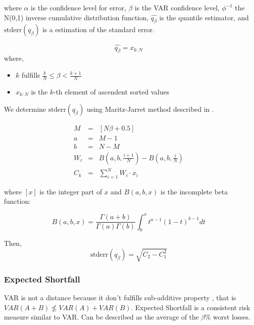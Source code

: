 \documentclass[a4paper,12pt,final]{article}
\begin{document}
where $\alpha$ is the confidence level for error, $\beta$ is the VAR confidence 
level, $\phi^{-1}$ the N(0,1) inverse cumulative distribution function, 
$\widehat{q_{\beta}}$ is the quantile estimator, and $\textrm{stderr}(q_{\beta})$
is a estimation of the standard error.

\begin{displaymath}
\widehat{q_{\beta}} = x_{k:N}
\end{displaymath}
where,
\begin{itemize}
\item $k$ fulfills $\frac{k}{N} \leq \beta < \frac{k+1}{N}$
\item $x_{k:N}$ is the $k$-th element of ascendent sorted values
\end{itemize}

We determine $\textrm{stderr}(q_{\beta})$ using Maritz-Jarret method described
in \cite{quant:algor}.

\begin{eqnarray}
M   & = & [N \beta + 0.5] \nonumber \\
a   & = & M - 1 \nonumber \\
b   & = & N - M \nonumber \\
W_i & = & B(a,b,\frac{i+1}{N}) - B(a,b,\frac{i}{N}) \nonumber \\
C_k & = & \sum_{i=1}^{N} W_i \cdot x_i \nonumber
\end{eqnarray}

where $[x]$ is the integer part of $x$ and $B(a,b,x)$ is the incomplete beta 
function:

\begin{displaymath}
B(a,b,x)=\frac{\Gamma(a+b)}{\Gamma(a)\Gamma(b)}\int_0^x t^{a-1} (1-t)^{b-1} dt
\end{displaymath}

Then,
\begin{displaymath}
\textrm{stderr}(q_{\beta}) = \sqrt{C_2 - C_1^2}
\end{displaymath}

\subsubsection{Expected Shortfall}
VAR is not a distance because it don't fulfills sub-additive property \cite{var:varbad}, 
that is $VAR(A+B) \nleq VAR(A)+VAR(B)$. Expected Shortfall is a consistent risk 
measure \cite{var:eshortfall} similar to VAR. Can be described as the average of 
the $\beta\%$ worst losses.
\end{document}
